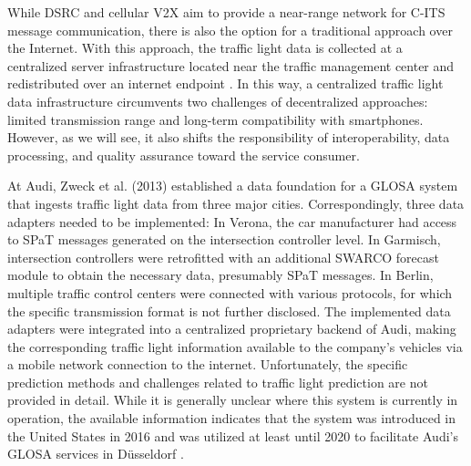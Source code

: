 While DSRC and cellular V2X aim to provide a near-range network for C-ITS message communication, there is also the option for a traditional approach over the Internet. With this approach, the traffic light data is collected at a centralized server infrastructure located near the traffic management center and redistributed over an internet endpoint \cite{zweck_traffic_2013, protschky_extensive_2014, protschky_adaptive_2014}. In this way, a centralized traffic light data infrastructure circumvents two challenges of decentralized approaches: limited transmission range and long-term compatibility with smartphones. However, as we will see, it also shifts the responsibility of interoperability, data processing, and quality assurance toward the service consumer.

At Audi, Zweck et al. (2013) \cite{zweck_traffic_2013} established a data foundation for a GLOSA system that ingests traffic light data from three major cities. Correspondingly, three data adapters needed to be implemented: In Verona, the car manufacturer had access to SPaT messages generated on the intersection controller level. In Garmisch, intersection controllers were retrofitted with an additional SWARCO forecast module to obtain the necessary data, presumably SPaT messages. In Berlin, multiple traffic control centers were connected with various protocols, for which the specific transmission format is not further disclosed. The implemented data adapters were integrated into a centralized proprietary backend of Audi, making the corresponding traffic light information available to the company's vehicles via a mobile network connection to the internet. Unfortunately, the specific prediction methods and challenges related to traffic light prediction are not provided in detail. While it is generally unclear where this system is currently in operation, the available information indicates that the system was introduced in the United States in 2016 and was utilized at least until 2020 to facilitate Audi's GLOSA services in Düsseldorf \cite{neuner_leitfaden_2020}.

